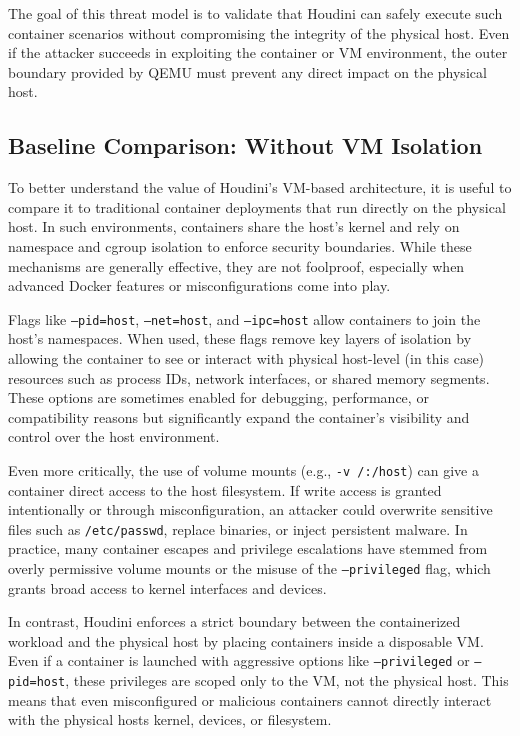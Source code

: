 \documentclass[12pt]{report}
\begin{document}
\begin{doublespace}
The goal of this threat model is to validate that Houdini can safely execute such container scenarios without compromising the integrity of the physical host. Even if the attacker succeeds in exploiting the container or VM environment, the outer boundary provided by QEMU must prevent any direct impact on the physical host.

\subsection{Baseline Comparison: Without VM Isolation}

To better understand the value of Houdini’s VM-based architecture, it is useful to compare it to traditional container deployments that run directly on the physical host. In such environments, containers share the host's kernel and rely on namespace and cgroup isolation to enforce security boundaries. While these mechanisms are generally effective, they are not foolproof, especially when advanced Docker features or misconfigurations come into play.

Flags like \texttt{--pid=host}, \texttt{--net=host}, and \texttt{--ipc=host} allow containers to join the host’s namespaces. When used, these flags remove key layers of isolation by allowing the container to see or interact with physical host-level (in this case) resources such as process IDs, network interfaces, or shared memory segments. These options are sometimes enabled for debugging, performance, or compatibility reasons but significantly expand the container’s visibility and control over the host environment.

Even more critically, the use of volume mounts (e.g., \texttt{-v /:/host}) can give a container direct access to the host filesystem. If write access is granted intentionally or through misconfiguration, an attacker could overwrite sensitive files such as \texttt{/etc/passwd}, replace binaries, or inject persistent malware. In practice, many container escapes and privilege escalations have stemmed from overly permissive volume mounts or the misuse of the \texttt{--privileged} flag, which grants broad access to kernel interfaces and devices.

In contrast, Houdini enforces a strict boundary between the containerized workload and the physical host by placing containers inside a disposable VM. Even if a container is launched with aggressive options like \texttt{--privileged} or \texttt{--pid=host}, these privileges are scoped only to the VM, not the physical host. This means that even misconfigured or malicious containers cannot directly interact with the physical hosts kernel, devices, or filesystem.


\end{doublespace}
\end{document}

